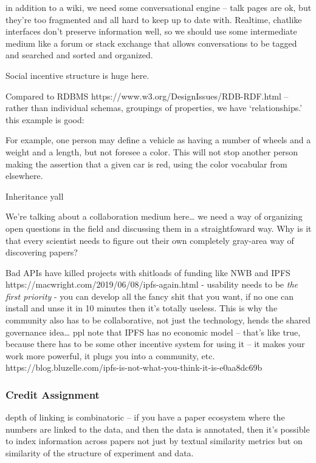 \documentclass{article}
\begin{document}
in addition to a wiki, we need some conversational engine -- talk pages
are ok, but they're too fragmented and all hard to keep up to date with.
Realtime, chatlike interfaces don't preserve information well, so we
should use some intermediate medium like a forum or stack exchange that
allows conversations to be tagged and searched and sorted and organized.

Social incentive structure is huge here.

Compared to RDBMS https://www.w3.org/DesignIssues/RDB-RDF.html -- rather
than individual schemas, groupings of properties, we have
`relationships.' this example is good:

\begin{leftbar}
For example, one person may define a vehicle as having a number of
wheels and a weight and a length, but not foresee a color. This will not
stop another person making the assertion that a given car is red, using
the color vocabular from elsewhere.
\end{leftbar}

Inheritance yall

We're talking about a collaboration medium here\ldots{} we need a way of
organizing open questions in the field and discussing them in a
straightfoward way. Why is it that every scientist needs to figure out
their own completely gray-area way of discovering papers?

Bad APIs have killed projects with shitloads of funding like NWB and
IPFS https://macwright.com/2019/06/08/ipfs-again.html - usability needs
to be \emph{the first priority} - you can develop all the fancy shit
that you want, if no one can install and unse it in 10 minutes then it's
totally useless. This is why the community also has to be collaborative,
not just the technology, hends the shared governance idea\ldots{} ppl
note that IPFS has no economic model -- that's like true, because there
has to be some other incentive system for using it -- it makes your work
more powerful, it plugs you into a community, etc.
https://blog.bluzelle.com/ipfs-is-not-what-you-think-it-is-e0aa8dc69b

\hypertarget{credit-assignment}{%
\subsubsection{Credit Assignment}\label{credit-assignment}}

depth of linking is combinatoric -- if you have a paper ecosystem where
the numbers are linked to the data, and then the data is annotated, then
it's possible to index information across papers not just by textual
similarity metrics but on similarity of the structure of experiment and
data.
\end{document}
